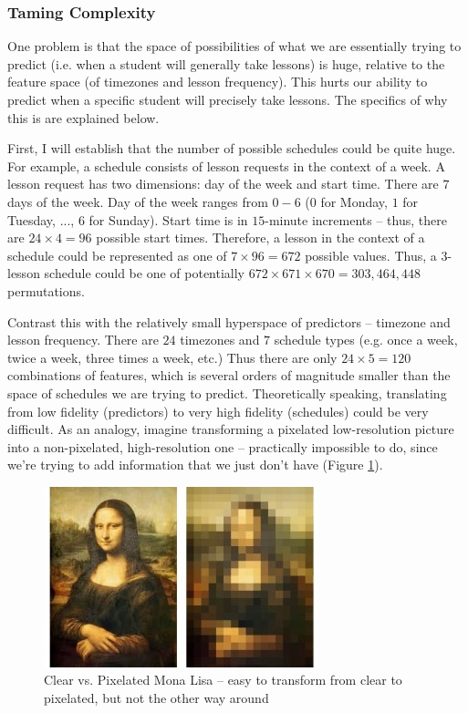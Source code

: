 \documentclass{article}
\begin{document}
\subsubsection{Taming Complexity}

One problem is that the space of possibilities of what we are essentially
trying to predict (i.e. when a student will generally take lessons) is huge,
relative to the feature space (of timezones and lesson frequency). This hurts
our ability to predict when a specific student will precisely take lessons. The
specifics of why this is are explained below.

First, I will establish that the number of possible schedules could be quite
huge. For example, a schedule consists of lesson requests in the context of a
week. A lesson request has two dimensions: day of the week and start time.
There are $7$ days of the week.  Day of the week ranges from $0-6$ ($0$ for
Monday, $1$ for Tuesday, ..., $6$ for Sunday).  Start time is in $15$-minute
increments -- thus, there are $24 \times 4 = 96$ possible start times.
Therefore, a lesson in the context of a schedule could be represented as one of
$7 \times 96 = 672$ possible values.  Thus, a $3$-lesson schedule could be one
of potentially $672 \times 671 \times 670 = 303,464,448$ permutations.

Contrast this with the relatively small hyperspace of predictors -- timezone
and lesson frequency. There are $24$ timezones and $7$ schedule types (e.g.
once a week, twice a week, three times a week, etc.) Thus there are only $24
\times 5 = 120$ combinations of features, which is several orders of magnitude
smaller than the space of schedules we are trying to predict.  Theoretically
speaking, translating from low fidelity (predictors) to very high fidelity
(schedules) could be very difficult. As an analogy, imagine transforming a
pixelated low-resolution picture into a non-pixelated, high-resolution one --
practically impossible to do, since we're trying to add information that we
just don't have (Figure \ref{fig:mona}).

\begin{figure}[h!]
\centering
\includegraphics[scale=0.75]{img/pixelmona.jpg}
\caption{Clear vs. Pixelated Mona Lisa -- easy to transform from clear to pixelated, but not the other way around}
\label{fig:mona}
\end{figure}
\end{document}
